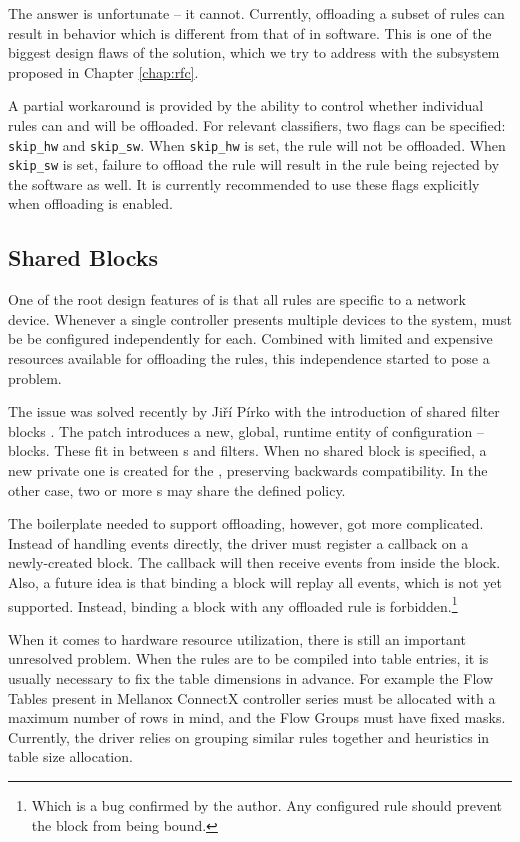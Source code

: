 The answer is unfortunate -- it cannot. Currently, offloading a subset of rules
can result in behavior which is different from that of  in software. This
is one of the biggest design flaws of the solution, which we try to address
with the subsystem proposed in Chapter \ref{chap:rfc}.

A partial workaround is provided by the ability to control whether individual rules
can and will be offloaded. For relevant classifiers, two flags can be specified:
\texttt{skip\_hw} and \texttt{skip\_sw}. When \texttt{skip\_hw} is set, the
rule will not be offloaded. When \texttt{skip\_sw} is set, failure to offload
the rule will result in the rule being rejected by the software as well.
It is currently recommended to use these flags explicitly when 
offloading is enabled.

\subsection{Shared Blocks}
\label{sec:tc-shared-blocks}

One of the root design features of  is that all rules are specific to
a network device. Whenever a single controller presents multiple devices to the
system,  must be be configured independently for each. Combined with
limited and expensive resources available for offloading the  rules, this
independence started to pose a problem.

The issue was solved recently by Jiří Pírko with the introduction of shared filter
blocks \cite{linux-shared-blocks}. The patch introduces a new, global, runtime
entity of  configuration -- blocks. These fit in between \qdisc{}s and
filters. When no shared block is specified, a new private one is created for the
\qdisc{}, preserving backwards compatibility. In the other case, two or more
\qdisc{}s may share the defined policy.

The boilerplate needed to support  offloading, however, got more
complicated. Instead of handling events directly, the driver must register
a callback on a newly-created block. The callback will then receive events from
inside the block. Also, a future idea is that binding a block will replay all
events, which is not yet supported. Instead, binding a block with any offloaded
rule is forbidden.\footnote{Which is a bug confirmed by the author. Any
configured rule should prevent the block from being bound.}

When it comes to hardware resource utilization, there is still an important
unresolved problem. When the rules are to be compiled into table entries, it is
usually necessary to fix the table dimensions in advance. For example the Flow
Tables present in Mellanox ConnectX controller series must be allocated with
a maximum number of rows in mind, and the Flow Groups must have fixed masks.
Currently, the driver relies on grouping similar rules together and heuristics
in table size allocation.
